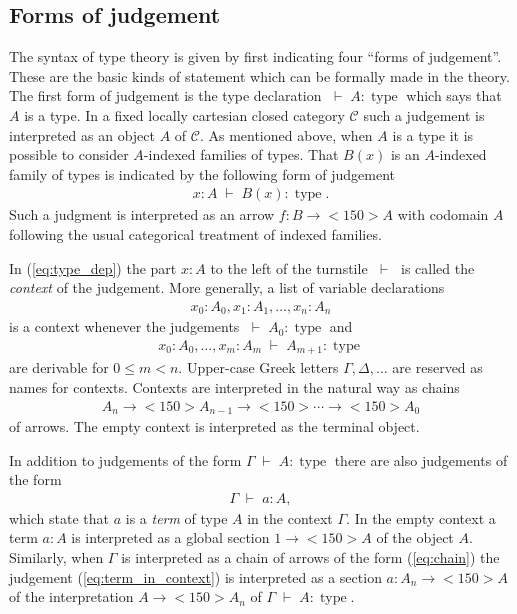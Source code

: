 \documentclass[12pt]{amsart}
\newcommand{\judge}[2]{#1\;\vdash\;#2}
\newcommand{\type}{\operatorname{type}}
\theoremstyle{definition}
\theoremstyle{remark}
\begin{document}
\subsection{Forms of judgement}

The syntax of type theory is given by first indicating four ``forms  
of judgement''.  These are the basic kinds of statement which can be
formally made in the theory.  The first form of judgement is the type
declaration $\judge{}{A:\type}$ which says that $A$ is a type.  In a
fixed locally cartesian closed category $\mathcal{C}$ such a judgement
is interpreted as an object $A$ of $\mathcal{C}$.  As mentioned above,
when $A$ is a type it is possible to consider
$A$-indexed families of types.  That $B(x)$ is an $A$-indexed family
of types is indicated by the following form of judgement
\begin{align}\label{eq:type_dep}  
  \judge{x:A}{B(x):\type}.  
\end{align}
Such a judgment is interpreted as an arrow $f:B\to<150>A$ 
with codomain $A$ following the usual categorical treatment of indexed
families.

In (\ref{eq:type_dep}) the part $x:A$
to the left of the turnstile $\;\vdash\;$ is called the \emph{context} of the
judgement.  More generally, a list of variable declarations
\begin{align*}
  x_{0}:A_{0},x_{1}:A_{1},\ldots,x_{n}:A_{n}
\end{align*}
is a context whenever the judgements $\judge{}{A_{0}:\type}$ and 
\begin{align*}
  \judge{x_{0}:A_{0},\ldots,x_{m}:A_{m}}{A_{m+1}:\type}
\end{align*}
are derivable for $0\leq m<n$.  Upper-case Greek letters
$\Gamma,\Delta,\ldots$ are reserved as names for contexts.  Contexts
are interpreted in the natural way as chains 
\begin{align}\label{eq:chain}
  A_{n}\to<150>A_{n-1}\to<150>\cdots\to<150>A_{0}
\end{align}
of arrows.  The empty context is interpreted as the terminal object.

In addition to judgements of the form $\judge{\Gamma}{A:\type}$ there
are also judgements of the form
\begin{align}\label{eq:term_in_context}
  \judge{\Gamma}{a:A},
\end{align}
which state that $a$ is a \emph{term} of type $A$ in the context
$\Gamma$.  In the empty context a term $a:A$ is interpreted as a
global section $1\to<150>A$ of the object $A$.  Similarly, when $\Gamma$ is
interpreted as a chain of arrows of the form (\ref{eq:chain}) the
judgement (\ref{eq:term_in_context}) is interpreted as a section $a:A_{n}\to<150>A$ of the interpretation $A\to<150>A_{n}$ of $\judge{\Gamma}{A:\type}$.
\end{document}

